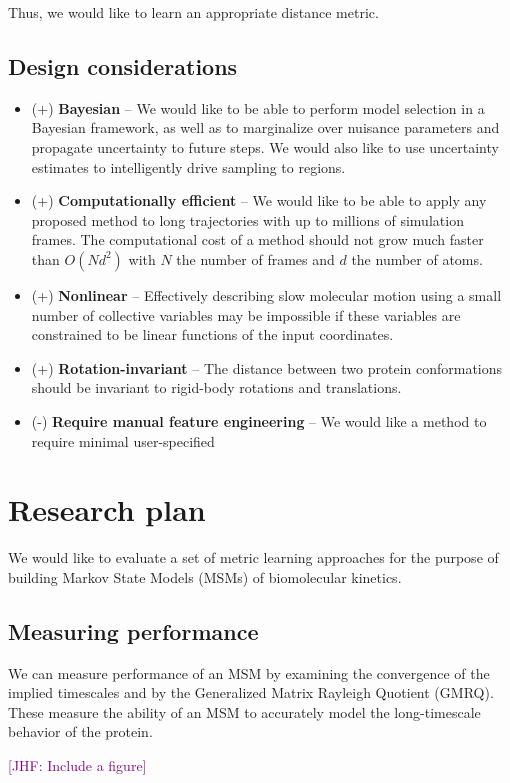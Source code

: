 \documentclass[aps,prl,preprint,nofootinbib,superscriptaddress,linenumbers]{revtex4-1}
\newcommand{\jhfcomment}[1]{\textcolor{purple}{[JHF: #1]}} 	%
\newcommand{\bemph}[1]{\textbf{#1}}
\begin{document}
Thus, we would like to learn an appropriate distance metric.

\subsection{Design considerations}
\begin{itemize}
	\item (+) \bemph{Bayesian} -- We would like to be able to perform model selection in a Bayesian framework, as well as to marginalize over nuisance parameters and propagate uncertainty to future steps. We would also like to use uncertainty estimates to intelligently drive sampling to regions.
    \item (+) \bemph{Computationally efficient} -- We would like to be able to apply any proposed method to long trajectories with up to millions of simulation frames. The computational cost of a method should not grow much faster than $O(Nd^2)$ with $N$ the number of frames and $d$ the number of atoms.
    \item (+) \bemph{Nonlinear} -- Effectively describing slow molecular motion using a small number of collective variables may be impossible if these variables are constrained to be linear functions of the input coordinates.
    \item (+) \bemph{Rotation-invariant} -- The distance between two protein conformations should be invariant to rigid-body rotations and translations.
    \item (-) \bemph{Require manual feature engineering} -- We would like a method to require minimal user-specified 
\end{itemize}

\section{Research plan}
We would like to evaluate a set of metric learning approaches for the purpose of building Markov State Models (MSMs) of biomolecular kinetics.

\subsection{Measuring performance}
We can measure performance of an MSM by examining the convergence of the implied timescales and by the Generalized Matrix Rayleigh Quotient (GMRQ). These measure the ability of an MSM to accurately model the long-timescale behavior of the protein.

\jhfcomment{Include a figure}
\end{document}
